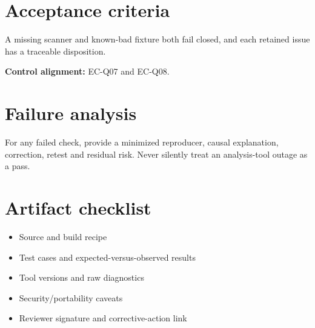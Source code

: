 \documentclass[10pt,letterpaper]{article}
\begin{document}
\section{Acceptance criteria}
A missing scanner and known-bad fixture both fail closed, and each retained issue has a traceable disposition.

\textbf{Control alignment:} EC-Q07 and EC-Q08.
\section{Failure analysis}
For any failed check, provide a minimized reproducer, causal explanation, correction, retest and residual risk. Never silently treat an analysis-tool outage as a pass.
\section{Artifact checklist}
\begin{itemize}
\item Source and build recipe
\item Test cases and expected-versus-observed results
\item Tool versions and raw diagnostics
\item Security/portability caveats
\item Reviewer signature and corrective-action link
\end{itemize}
\end{document}

